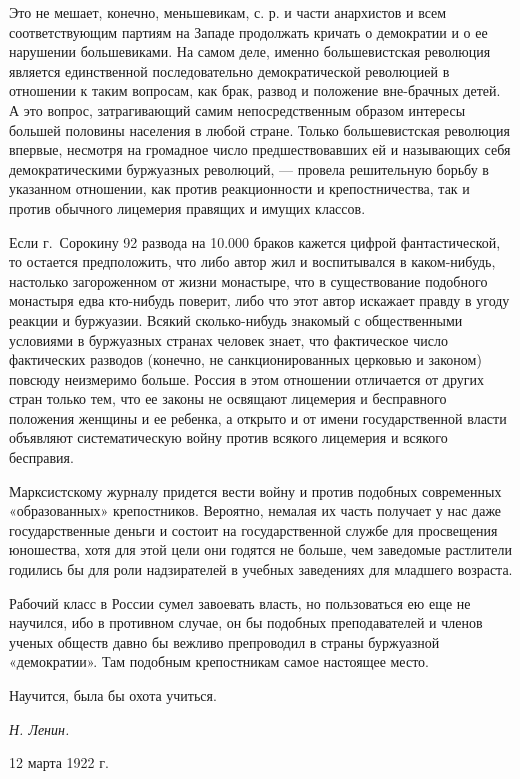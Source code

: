 Это не мешает, конечно, меньшевикам, с. р. и части анархистов и всем
соответствующим партиям на Западе продолжать кричать о демократии и о ее
нарушении большевиками. На самом деле, именно большевистская революция
является единственной последовательно демократической революцией в
отношении к таким вопросам, как брак, развод и положение вне-брачных детей.
А это вопрос, затрагивающий самим непосредственным образом интересы большей
половины населения в любой стране. Только большевистская революция впервые,
несмотря на громадное число предшествовавших ей и называющих себя
демократическими буржуазных революций, — провела решительную борьбу в
указанном отношении, как против реакционности и крепостничества, так и
против обычного лицемерия правящих и имущих классов.

Если г.~Сорокину 92 развода на 10.000 браков кажется
цифрой фантастической, то остается предположить, что либо автор жил и
воспитывался в каком-нибудь, настолько загороженном от жизни монастыре, что
в существование подобного монастыря едва кто-нибудь поверит, либо что этот
автор искажает правду в угоду реакции и буржуазии. Всякий сколько-нибудь
знакомый с общественными условиями в буржуазных странах человек знает, что
фактическое число фактических разводов (конечно, не санкционированных
церковью и законом) повсюду неизмеримо больше. Россия в этом отношении
отличается от других стран только тем, что ее законы не освящают лицемерия
и бесправного положения женщины и ее ребенка, а открыто и от имени
государственной власти объявляют систематическую войну против всякого
лицемерия и всякого бесправия.

Марксистскому журналу придется вести войну и против подобных современных
«образованных» крепостников. Вероятно, немалая их часть получает у нас даже
государственные деньги и состоит на государственной службе для просвещения
юношества, хотя для этой цели они годятся не больше, чем заведомые
растлители годились бы для роли надзирателей в учебных заведениях для
младшего возраста.

Рабочий класс в России сумел завоевать власть, но пользоваться ею еще не
научился, ибо в противном случае, он бы подобных преподавателей и членов
ученых обществ давно бы вежливо препроводил в страны буржуазной
«демократии». Там подобным крепостникам самое настоящее место.

Научится, была бы охота учиться.

{\raggedleft
\textit{Н. Ленин.}
\par}

12 марта 1922 г.


\bigskip

